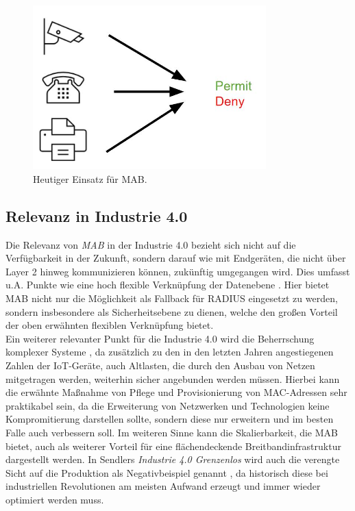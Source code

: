 \documentclass[conference]{IEEEtran}
\begin{document}
\begin{figure}[hbt]
	\centering
	\includegraphics[width=9cm]{figures/MAB_heutiger_Einsatz}
	\caption{Heutiger Einsatz für MAB.}
	\label{fig:mab-today}
\end{figure}

\vspace{.5em}
\subsection{Relevanz in Industrie 4.0}
Die Relevanz von \emph{MAB} in der Industrie 4.0 bezieht sich nicht auf die Verfügbarkeit in der Zukunft, sondern darauf wie mit Endgeräten, die nicht über Layer 2 hinweg kommunizieren können, zukünftig umgegangen wird. Dies umfasst u.A. Punkte wie eine hoch flexible Verknüpfung der Datenebene \cite{hirsch2014wandel}. Hier bietet MAB nicht nur die Möglichkeit als Fallback für RADIUS eingesetzt zu werden, sondern insbesondere als Sicherheitsebene zu dienen, welche den großen Vorteil der oben erwähnten flexiblen Verknüpfung bietet.\\

Ein weiterer relevanter Punkt für die Industrie 4.0 wird die Beherrschung komplexer Systeme \cite{botthof2015zukunft}, da zusätzlich zu den in den letzten Jahren angestiegenen Zahlen der IoT-Geräte, auch Altlasten, die durch den Ausbau von Netzen mitgetragen werden, weiterhin sicher angebunden werden müssen. Hierbei kann die erwähnte Maßnahme von Pflege und Provisionierung von MAC-Adressen sehr praktikabel sein, da die Erweiterung von Netzwerken und Technologien keine Kompromitierung darstellen sollte, sondern diese nur erweitern und im besten Falle auch verbessern soll. Im weiteren Sinne kann die Skalierbarkeit, die MAB bietet, auch als weiterer Vorteil für eine flächendeckende Breitbandinfrastruktur \cite{botthof2015zukunft} dargestellt werden. In Sendlers \emph{Industrie 4.0 Grenzenlos} wird auch die verengte Sicht auf die Produktion als Negativbeispiel genannt \cite{sendler2016industrie}, da historisch diese bei industriellen Revolutionen am meisten Aufwand erzeugt und immer wieder optimiert werden muss.\\
\end{document}
